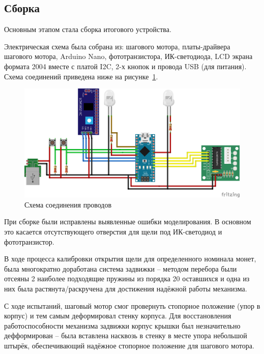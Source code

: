 \subsection{Сборка}

Основным этапом стала сборка итогового устройства.
\par\medskip

Электрическая схема была собрана из: шагового мотора, платы-драйвера шагового мотора, Arduino Nano, фототранзистора, ИК-светодиода, LCD экрана формата 2004 вместе с платой I2C, 2-х кнопок и провода USB (для питания). Схема соединений приведена ниже на рисунке~\ref{ris:scheme_electric}.

\begin{figure}[H]
	\centering
	\includegraphics[width=12cm]{scheme_png.png}
	\caption{Схема соединения проводов}
	\label{ris:scheme_electric}
\end{figure}

При сборке были исправлены выявленные ошибки моделирования. В основном это касается отсутствующего отверстия для щели под ИК-светодиод и фототранзистор.
\par\medskip

В ходе процесса калибровки открытия щели для определенного номинала монет, была многократно доработана система задвижки -- методом перебора были отсеяны 2 наиболее подходящие пружины из порядка 20 оставшихся и одна из них была растянута/раскручена для достижения надёжной работы механизма.
\par\medskip

С ходе испытаний, шаговый мотор смог провернуть стопорное положение (упор в корпус) и тем самым деформировал стенку корпуса. Для восстановления работоспособности механизма задвижки корпус крышки был незначительно дефформирован -- была вставлена насквозь в стенку в месте упора небольшой штырёк, обеспечивающий надёжное стопорное положение для шагового мотора.
